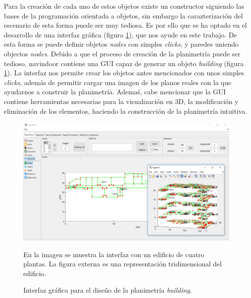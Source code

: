 Para la creación de cada uno de estos objetos existe un constructor siguiendo las bases de la programación orientada a objetos, sin embargo la carazterización del escenario de esta forma puede ser muy tediosa. Es por ello que se ha optado en el desarrollo de una interfaz gráfica (figura \ref{fig:interfaz1}), que nos ayude en este trabajo. De esta forma se puede definir objetos \emph{nodes} con simples \emph{clicks}, y paredes uniendo objectos \emph{nodes}. 
Debido a que el proceso de creación de la planimetría puede ser tedioso, navindoor contiene una GUI capaz de generar un objeto \emph{building} (figura \ref{fig:interfaz1}). La interfaz nos permite crear los objetos antes mencionados con unos simples \emph{clicks}, además de permitir cargar una imagen de los planos reales con la que ayudarnos a construir la planimetría. Ademaś, cabe mencionar que la GUI contiene herramientas necesarias para la visualización en 3D, la modificación y eliminación de los elementos, haciendo la construcción de la planimetría intuitiva.

\begin{figure}
    \centering
    \includegraphics[width=1.05\columnwidth]{img/Design/1.PNG}
    \caption{Interfaz gráfica para el diseño de la planimetría \emph{building}.}
    \footnotesize
    En la imagen se muestra la interfaz con un edificio de cuatro plantas. La figura externa es una representación tridimensional del edificio.
    \label{fig:interfaz1}
\end{figure}



